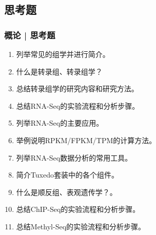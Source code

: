 \subsection{思考题}
\begin{frame}[label=current]
  \frametitle{概论 | 思考题}
  \begin{enumerate}
    \item 列举常见的组学并进行简介。
    \item 什么是转录组、转录组学？
    \item 总结转录组学的研究内容和研究方法。
    \item 总结RNA-Seq的实验流程和分析步骤。
    \item 列举RNA-Seq的主要应用。
    \item 举例说明RPKM/FPKM/TPM的计算方法。
    \item 列举RNA-Seq数据分析的常用工具。
    \item 简介Tuxedo套装中的各个组件。
    \item 什么是顺反组、表观遗传学？。
    \item 总结ChIP-Seq的实验流程和分析步骤。
    \item 总结Methyl-Seq的实验流程和分析步骤。
  \end{enumerate}
\end{frame}




